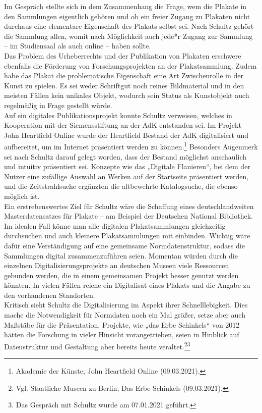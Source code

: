 \documentclass[a4paper,12pt,ngerman]{article}
\begin{document}
Im Gespräch stellte sich in dem Zusammenhang die Frage, wem die Plakate in den Sammlungen eigentlich gehören und ob ein freier Zugang zu Plakaten nicht durchaus eine elementare Eigenschaft des Plakats selbst sei. Nach Schultz gehört die Sammlung allen, womit nach Möglichkeit auch jede*r Zugang zur Sammlung -- im Studiensaal als auch online -- haben sollte. \\
Das Problem des Urheberrechts und der Publikation von Plakaten erschwere ebenfalls die Förderung von Forschungsprojekten an der Plakatsammlung. Zudem habe das Plakat die problematische Eigenschaft eine Art Zwischenrolle in der Kunst zu spielen. Es sei weder Schriftgut noch reines Bildmaterial und in den meisten Fällen kein unikales Objekt, wodurch sein Status als Kunstobjekt auch regelmäßig in Frage gestellt würde. \\
Auf ein digitales Publikationsprojekt konnte Schultz verweisen, welches in Kooperation mit der Siemensstiftung an der AdK entstanden sei. Im Projekt John Heartfield Online wurde der Heartfield Bestand der AdK digitalisiert und aufbereitet, um im Internet präsentiert werden zu können.\footnote{Akademie der Künste, John Heartfield Online (09.03.2021).} Besonders Augenmerk sei nach Schultz darauf gelegt worden, dass der Bestand möglichst anschaulich und intuitiv präsentiert sei. Konzepte wie das „Digitale Flanieren“, bei dem der Nutzer eine zufällige Auswahl an Werken auf der Startseite präsentiert werden, und die Zeitstrahlsuche ergänzten die altbewehrte Katalogsuche, die ebenso möglich ist. \\
Ein erstrebenswertes Ziel für Schultz wäre die Schaffung eines deutschlandweiten Masterdatensatzes für Plakate -- am Beispiel der Deutschen National Bibliothek. Im idealen Fall könne man alle digitalen Plakatsammlungen gleichzeitig durchsuchen und auch kleinere Plakatsammlungen mit einbinden. Wichtig wäre dafür eine Verständigung auf eine gemeinsame Normdatenstruktur, sodass die Sammlungen digital zusammenzuführen seien. Momentan würden durch die einzelnen Digitalisierungsprojekte an deutschen Museen viele Ressourcen gebunden werden, die in einem gemeinsamen Projekt besser genutzt werden könnten. In vielen Fällen reiche ein Digitalisat eines Plakats und die Angabe zu den vorhandenen Standorten. \\
Kritisch sieht Schultz die Digitalisierung im Aspekt ihrer Schnelllebigkeit. Dies mache die Notwendigkeit für Normdaten noch ein Mal größer, setze aber auch Maßstäbe für die Präsentation. Projekte, wie „das Erbe Schinkels“ von 2012 hätten die Forschung in vieler Hinsicht vorangetrieben, seien in Hinblick auf Datenstruktur und Gestaltung aber bereits heute veraltet.\footnote{Vgl. Staatliche Museen zu Berlin, Das Erbe Schinkels (09.03.2021).}\footnote{Das Gespräch mit Schultz wurde am 07.01.2021 geführt.}
\end{document}
